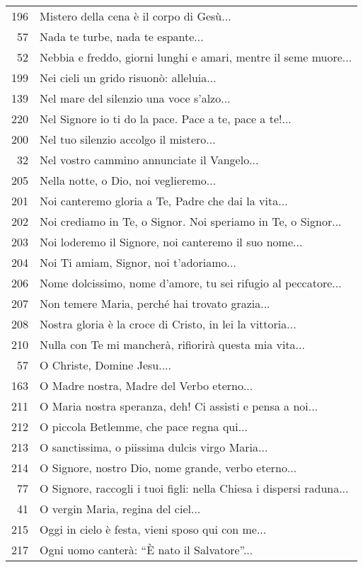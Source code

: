 {\begin{flushleft}
\begin{longtable}{r m{11cm}}
    196 & Mistero della cena è il corpo di Gesù...\\
    57 & Nada te turbe, nada te espante...\\
    52 & Nebbia e freddo, giorni lunghi e amari, mentre il seme muore...\\
    199 & Nei cieli un grido risuonò: alleluia...\\
    139 & Nel mare del silenzio una voce s'alzo...\\
    220 & Nel Signore io ti do la pace. Pace a te, pace a te!...\\
    200 & Nel tuo silenzio accolgo il mistero...\\
    32 & Nel vostro cammino annunciate il Vangelo...\\
    205 & Nella notte, o Dio, noi veglieremo...\\
    201 & Noi canteremo gloria a Te, Padre che dai la vita...\\
    202 & Noi crediamo in Te, o Signor. Noi speriamo in Te, o Signor...\\
    203 & Noi loderemo il Signore, noi canteremo il suo nome...\\
    204 & Noi Ti amiam, Signor, noi t'adoriamo...\\
    206 & Nome dolcissimo, nome d'amore, tu sei rifugio al peccatore...\\
    207 & Non temere Maria, perché hai trovato grazia...\\
    208 & Nostra gloria è la croce di Cristo, in lei la vittoria...\\
    210 & Nulla con Te mi mancherà, rifiorirà questa mia vita...\\
    57 & O Christe, Domine Jesu....\\
    163 & O Madre nostra, Madre del Verbo eterno...\\
    211 & O Maria nostra speranza, deh! Ci assisti e pensa a noi...\\
    212 & O piccola Betlemme, che pace regna qui...\\
    213 & O sanctissima, o piissima dulcis virgo Maria...\\
    214 & O Signore, nostro Dio, nome grande, verbo eterno...\\
    77 & O Signore, raccogli i tuoi figli: nella Chiesa i dispersi raduna...\\
    41 & O vergin Maria, regina del ciel...\\
    215 & Oggi in cielo è festa, vieni sposo qui con me...\\
    217 & Ogni uomo canterà: ``È nato il Salvatore''...\\

\end{longtable}
\end{flushleft}}
